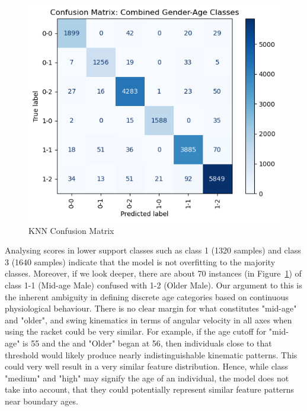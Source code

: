 \documentclass[10pt,twocolumn]{article}
\begin{document}
\begin{figure}[H]
    \centering
    \includegraphics[width=0.85\linewidth]{images/knn/knn cm.png}
    \caption{KNN Confusion Matrix}
    \label{fig:knn-cm}
\end{figure}
Analysing scores in lower support classes such as class 1 (1320 samples) and class 3 (1640 samples) indicate that the model is not overfitting to the majority classes. Moreover, if we look deeper, there are about 70 instances (in Figure~\ref{fig:knn-cm}) of class 1-1 (Mid-age Male) confused with 1-2 (Older Male). Our argument to this is the inherent ambiguity in defining discrete age categories based on continuous physiological behaviour. There is no clear margin for what constitutes "mid-age" and "older", and swing kinematics in terms of angular velocity in all axes when using the racket could be very similar. For example, if the age cutoff for "mid-age" is 55 and the and "Older" began at 56, then individuals close to that threshold would likely produce nearly indistinguishable kinematic patterns. This could very well result in a very similar feature distribution. Hence, while class "medium" and "high" may signify the age of an individual, the model does not take into account, that they could potentially represent similar feature patterns near boundary ages.
%
\end{document}
